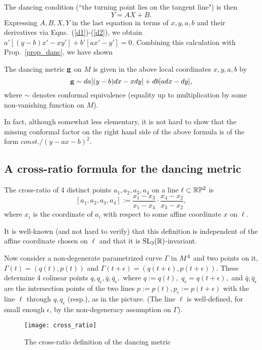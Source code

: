 The dancing condition (``the turning point  lies on the tangent line") is then 
$$
Y=AX+B.
$$
Expressing $A,B, X,Y$ in the last equation in terms of $x,y,a,b$ and their derivatives via Eqns.~(\ref{d1})-(\ref{d2}), we obtain $a'[(y - b)x' - xy'] + b'[ax' - y']=0.$
Combining this calculation with Prop.~\ref{prop_danc},  we have shown
\begin{proposition}
The dancing metric $\mathbf{ g}$ on  $M$ is given in the above local coordinates $x,y,a, b$ by 
$$\mathbf{ g}\sim da[(y - b)dx - xdy] + db[adx - dy],$$
where $\sim$ denotes conformal equivalence (equality up to multiplication by some  non-vanishing function on $M$). 

\end{proposition}

\begin{rmrk} In fact, although somewhat less elementary, it is not hard   to show that the missing conformal factor on the right hand side of   the above formula  is  of the form $const./(y-ax-b)^2.$ 
 \end{rmrk}


\subsection{A cross-ratio  formula for the dancing metric}\label{ss_cr}
\newcommand{\tq}{\bar q}

\begin{definition} The cross-ratio of 4 distinct points $a_1,a_2,a_3,a_4$ on a line $\ell\subset \mathbb{R}\mathbb{P}^2$  is  $$ [a_1,a_2,a_3,a_4]:= \frac {x_1-x_3 }{x_1-x_4 }\cdot\frac{x_4-x_2} {x_3-x_2},$$ where $x_i$ is the coordinate of $a_i$ with respect   to some affine coordinate  $x$ on  $\ell$.\end{definition} 


It is well-known (and not hard  to verify) that this definition is independent of the affine coordinate chosen on $\ell$  and that it is ${\mathrm{SL}_3(\mathbb{R})}$-invariant. 

\sn 

Now consider a non-degenerate parametrized curve $\Gamma$  in $M^4$ and two points on it, $\Gamma(t)=(q(t), p(t))$ and $ \Gamma(t+\epsilon)=(q(t+\epsilon), p(t+\epsilon))$. These determine 4 colinear points 
$q,  q_\epsilon,  \tq,  \tq_\epsilon,$
 where  $q:=q(t),$ $q_\epsilon=q(t+\epsilon),$ and $ \tq,   \tq_\epsilon$   are the intersection points of the two lines $p:=p(t), p_\epsilon:=p(t+\epsilon)$ with the line $\ell$ through $q, q_\epsilon$ (resp.), as  in the picture. (The line $\ell$ is well-defined, for small enough $\epsilon$, by the non-degeneracy assumption on $\Gamma$). 
\begin{figure}[h]\centering
\texttt{[image: cross\_ratio]}
\caption{\small The cross-ratio definition  of the dancing metric }
\end{figure}






